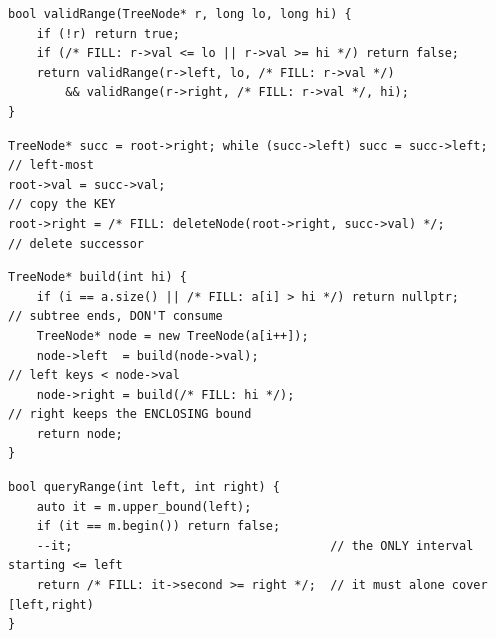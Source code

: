 \begin{lstlisting}[caption={Drill 2 -- bounds validation (from \coderef{c05-validate})}]
bool validRange(TreeNode* r, long lo, long hi) {
    if (!r) return true;
    if (/* FILL: r->val <= lo || r->val >= hi */) return false;
    return validRange(r->left, lo, /* FILL: r->val */)
        && validRange(r->right, /* FILL: r->val */, hi);
}
\end{lstlisting}

\begin{lstlisting}[caption={Drill 3 -- two-child delete splice (from \coderef{c05-delcode})}]
TreeNode* succ = root->right; while (succ->left) succ = succ->left;   // left-most
root->val = succ->val;                                                // copy the KEY
root->right = /* FILL: deleteNode(root->right, succ->val) */;         // delete successor
\end{lstlisting}

\begin{lstlisting}[caption={Drill 4 -- preorder rebuild (from \coderef{c05-build})}]
TreeNode* build(int hi) {
    if (i == a.size() || /* FILL: a[i] > hi */) return nullptr;       // subtree ends, DON'T consume
    TreeNode* node = new TreeNode(a[i++]);
    node->left  = build(node->val);                                   // left keys < node->val
    node->right = build(/* FILL: hi */);                              // right keeps the ENCLOSING bound
    return node;
}
\end{lstlisting}

\begin{lstlisting}[caption={Drill 5 -- interval coverage query (from \coderef{c05-range})}]
bool queryRange(int left, int right) {
    auto it = m.upper_bound(left);
    if (it == m.begin()) return false;
    --it;                                    // the ONLY interval starting <= left
    return /* FILL: it->second >= right */;  // it must alone cover [left,right)
}
\end{lstlisting}

